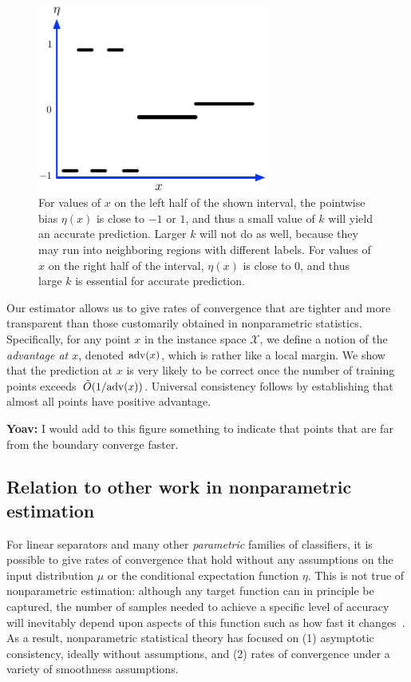 \documentclass{article}
\def\X{{\mathcal X}}
\def\adv{{\rm adv}}
\begin{document}
\begin{figure}
\begin{center}
\includegraphics[width=3in]{adaptive-rationale.pdf}
\end{center}
\caption{For values of $x$ on the left half of the shown interval, the
  pointwise bias $\eta(x)$ is close to $-1$ or $1$, and thus a small value of $k$ will yield an accurate prediction. Larger $k$ will not do as well, because they may run into neighboring regions with different labels. For values of $x$ on the right half of the interval, $\eta(x)$ is close to $0$, and thus large $k$ is essential for accurate prediction.}
\label{fig:rationale}
\end{figure}

Our estimator allows us to give rates of convergence that are tighter and more 
transparent than those customarily obtained in nonparametric statistics. Specifically, for any point $x$ in the instance space $\X$, we define a notion of the {\it advantage at $x$}, denoted $\adv(x)$, which is rather like a local margin. We show that the prediction at $x$ is very likely to be correct once the number of training points exceeds~$\tilde{O}(1/\adv(x))$. Universal consistency follows by establishing that almost all points have positive advantage.

{\bf Yoav:} I would add to this figure something to indicate that
points that are far from the boundary converge faster.
  
\subsection{Relation to other work in nonparametric estimation}

For linear separators and many other {\it parametric} families of classifiers, it is possible to give rates of convergence that hold without any assumptions on the input distribution $\mu$ or the conditional expectation function $\eta$. This is not true of nonparametric estimation: although any target function can in principle be captured, the number of samples needed to achieve a specific level of accuracy will inevitably depend upon aspects of this function such as how fast it changes~\cite[chapter 7]{DGL96}. As a result, nonparametric statistical theory has focused on (1) asymptotic consistency, ideally without assumptions, and (2) rates of convergence under a variety of smoothness assumptions.
\end{document}
